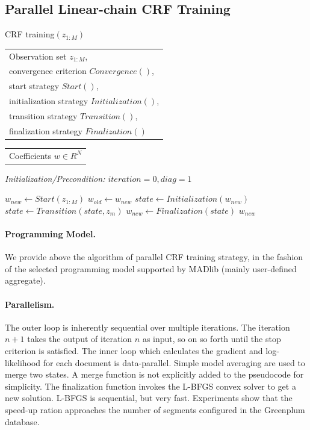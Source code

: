 \documentclass[11pt,letterpaper]{article}
\newlength{\alglabelwidth}
\newcommand{\alginput}[1]{%
\par\noindent%
\settowidth{\alglabelwidth}{\emph{Output:}}%
\makebox[\alglabelwidth][l]{\emph{Input:}} \begin{tabular}[t]{l} #1 \end{tabular}}
\newcommand{\algoutput}[1]{%
\par\noindent%
\settowidth{\alglabelwidth}{\emph{Output:}}%
\makebox[\alglabelwidth][l]{\emph{Output:}} \begin{tabular}[t]{l} #1 \end{tabular}}
\newcommand{\algprecond}[1]{%
\par\noindent\textit{Initialization/Precondition: #1}}
\begin{document}
\subsection{Parallel Linear-chain CRF Training}
\begin{algorithm} 
\caption{CRF training$(z_{1:M})$} \label{alg:CRF training}
\alginput{Observation set $z_{1:M}$,\\
convergence criterion $\mathit{Convergence}()$,\\
start strategy $\mathit{Start}()$,\\
initialization strategy $\mathit{Initialization}()$,\\
transition strategy $\mathit{Transition}()$,\\
finalization strategy $\mathit{Finalization}()$}
\algoutput{Coefficients $w \in R^N$}
\algprecond{$iteration = 0, diag = 1$}
\begin{algorithmic}[1]
\State $w_{new} \gets \mathit{Start}(z_{1:M})$
\Repeat
        \State $w_{old} \gets w_{new}$
        \State $\mathit{state} \gets \mathit{Initialization}(w_{new})$
 
\State $\mathit{state} \gets \mathit{Transition}(\mathit{state}, z_m)$
\EndFor
\State $w_{new} \gets Finalization(\mathit{state})$ 
    \State \Return $w_{new}$
\end{algorithmic}
\end{algorithm}

\paragraph{Programming Model.}
We provide above the algorithm of parallel CRF training strategy, in the fashion of the selected programming model supported by MADlib (mainly user-defined aggregate).

\paragraph{Parallelism.}
The outer loop is inherently sequential over multiple iterations.
The iteration $n+1$ takes the output of iteration $n$ as input, so on so forth until the stop criterion is satisfied.
The inner loop which calculates the gradient and log-likelihood for each document is data-parallel.
Simple model averaging are used to merge two states.
A merge function is not explicitly added to the pseudocode for simplicity.
The finalization function invokes the L-BFGS convex solver to get a new solution. L-BFGS is sequential, but very fast.
Experiments show that the speed-up ration approaches the number of segments configured in the Greenplum database.
\end{document}
